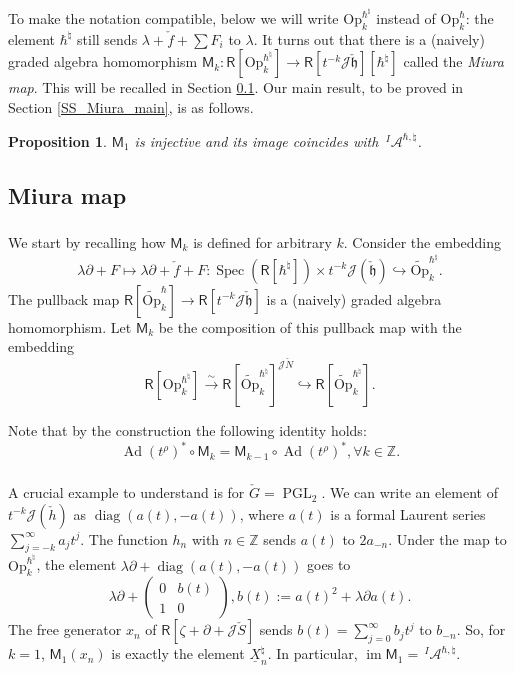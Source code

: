 \documentclass{amsart}
\newtheorem{Prop}[Thm]{Proposition}
\theoremstyle{definition}
\newcommand{\sss}{\subsubsection{}}
\newcommand{\on}{\mathrm}
\newcommand{\Ring}{\mathsf{R}}
\newcommand{\h}{\mathfrak{h}}
\newcommand{\Z}{\mathbb{Z}}
\newcommand{\A}{\mathscr{A}}
\newcommand{\Jet}{\mathscr{J}}
\newcommand{\Op}{\on{Op}}
\numberwithin{equation}{section}
\begin{document}
To make the notation compatible, below we will write $\Op^{\hbar^\natural}_k$ instead of
$\Op^{\hbar}_k$: the element $\hbar^\natural$ still sends $\lambda+\check{f}+\sum F_i$ to $\lambda$. 
It turns out that there is a (naively) graded algebra homomorphism 
$\mathsf{M}_k:\Ring[\Op^{\hbar^\natural}_k]\rightarrow \Ring[t^{-k}\Jet\check{\h}][\hbar^\natural]$ called the {\it Miura map}. This will be recalled in Section \ref{SS_Miura}. Our main result, to be proved in Section \ref{SS_Miura_main}, is as follows.

\begin{Prop}\label{Prop:Miura_isomorphism}
$\mathsf{M}_1$ is injective and its image coincides with $\,^I\!\A^{\hbar,\natural}$.
\end{Prop}



\subsection{Miura map}\label{SS_Miura}
\sss We start by recalling how $\mathsf{M}_k$ is defined for arbitrary $k$.  Consider the embedding
\begin{equation}\label{eq:jet_Cartan_embedding}
\lambda\partial+F\mapsto \lambda\partial+\check{f}+F: \operatorname{Spec}(\Ring[\hbar^\natural])\times t^{-k}\Jet(\check{\h})\hookrightarrow 
\widetilde{\Op}^{\hbar^\natural}_k.
\end{equation}
The pullback map $\Ring[\widetilde{\Op}^\hbar_k]\rightarrow \Ring[t^{-k}\Jet\check{\h}]$ is a (naively) graded algebra homomorphism. Let $\mathsf{M}_k$ be the composition of this pullback map with the embedding
$$\Ring[\Op^{\hbar^\natural}_k]\xrightarrow{\sim} \Ring[\widetilde{\Op}^{\hbar^\natural}_k]^{\Jet \check{N}}\hookrightarrow 
\Ring[\widetilde{\Op}^{\hbar^\natural}_k].$$

Note that by the construction the following identity holds:
\begin{equation}\label{eq:Miura_relation}
\operatorname{Ad}(t^\rho)^*\circ \mathsf{M}_k=\mathsf{M}_{k-1}\circ \operatorname{Ad}(t^\rho)^*, \forall k\in \Z. 
\end{equation}

\sss\label{SSS_opers_SL_2_example} A crucial example to understand is for $\check{G}=\operatorname{PGL}_2$. We can write an element of $t^{-k}\Jet(\check{h})$ as $\operatorname{diag}(a(t),-a(t))$, where $a(t)$ is a formal Laurent series $\sum_{j=-k}^\infty a_j t^j$. The function $h_n$ with $n\in \Z$ sends $a(t)$ to $2a_{-n}$. 
Under the map to $\Op^{\hbar^\natural}_k$, the element $\lambda\partial+\operatorname{diag}(a(t),-a(t))$ goes to 
$$\lambda\partial+\begin{pmatrix}0&b(t)\\1&0\end{pmatrix}, b(t):=a(t)^2+\lambda \partial a(t).$$
The free generator $x_n$ of $\Ring[\zeta+\partial+\Jet\check{S}]$ sends 
$b(t)=\sum_{j=0}^\infty b_j t^j$ to $b_{-n}$. So, for $k=1$, 
$\mathsf{M}_1(x_n)$ is exactly the element $\underline{X}_n^\natural$. In particular,  $\operatorname{im}\mathsf{M}_1=\,^I\!\A^{\hbar,\natural}$.
\end{document}
